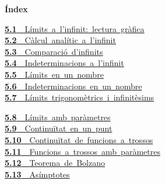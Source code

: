 \documentclass[11pt,a4paper]{article}
\begin{document}
\begin{tcolorbox}[colback=fmsurface,colframe=fmsurface,arc=3mm,left=4mm,right=4mm,top=2mm,bottom=2mm]
\small\textbf{Índex}\par\smallskip
\begin{minipage}[t]{0.49\linewidth}\small \mbox{\hyperlink{sec1}{\textbf{\color{fmgreen}5.1}\ \ Límits a l'infinit: lectura gràfica}}\\[3pt]
\mbox{\hyperlink{sec2}{\textbf{\color{fmgreen}5.2}\ \ Càlcul analític a l'infinit}}\\[3pt]
\mbox{\hyperlink{sec3}{\textbf{\color{fmgreen}5.3}\ \ Comparació d'infinits}}\\[3pt]
\mbox{\hyperlink{sec4}{\textbf{\color{fmgreen}5.4}\ \ Indeterminacions a l'infinit}}\\[3pt]
\mbox{\hyperlink{sec5}{\textbf{\color{fmgreen}5.5}\ \ Límits en un nombre}}\\[3pt]
\mbox{\hyperlink{sec6}{\textbf{\color{fmgreen}5.6}\ \ Indeterminacions en un nombre}}\\[3pt]
\mbox{\hyperlink{sec7}{\textbf{\color{fmgreen}5.7}\ \ Límits trigonomètrics i infinitèsims}}\\[3pt]\end{minipage}\hfill\begin{minipage}[t]{0.49\linewidth}\small \mbox{\hyperlink{sec8}{\textbf{\color{fmgreen}5.8}\ \ Límits amb paràmetres}}\\[3pt]
\mbox{\hyperlink{sec9}{\textbf{\color{fmgreen}5.9}\ \ Continuïtat en un punt}}\\[3pt]
\mbox{\hyperlink{sec10}{\textbf{\color{fmgreen}5.10}\ \ Continuïtat de funcions a trossos}}\\[3pt]
\mbox{\hyperlink{sec11}{\textbf{\color{fmgreen}5.11}\ \ Funcions a trossos amb paràmetres}}\\[3pt]
\mbox{\hyperlink{sec12}{\textbf{\color{fmgreen}5.12}\ \ Teorema de Bolzano}}\\[3pt]
\mbox{\hyperlink{sec13}{\textbf{\color{fmgreen}5.13}\ \ Asímptotes}}\\[3pt]\end{minipage}
\end{tcolorbox}

\end{document}
